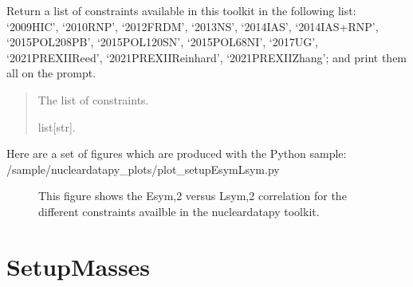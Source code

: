 \documentclass[letterpaper,10pt,english]{sphinxmanual}
\begin{document}

\begin{fulllineitems}
\label{\detokenize{source/api/setup_EsymLsym:nucleardatapy.setup_EsymLsym.constraints_EsymLsym}}
\pysigstartsignatures
{}
\pysigstopsignatures
\sphinxAtStartPar
Return a list of constraints available in this toolkit in the     following list: ‘2009\sphinxhyphen{}HIC’, ‘2010\sphinxhyphen{}RNP’, ‘2012\sphinxhyphen{}FRDM’, ‘2013\sphinxhyphen{}NS’,     ‘2014\sphinxhyphen{}IAS’, ‘2014\sphinxhyphen{}IAS+RNP’, ‘2015\sphinxhyphen{}POL\sphinxhyphen{}208PB’, ‘2015\sphinxhyphen{}POL\sphinxhyphen{}120SN’,     ‘2015\sphinxhyphen{}POL\sphinxhyphen{}68NI’, ‘2017\sphinxhyphen{}UG’, ‘2021\sphinxhyphen{}PREXII\sphinxhyphen{}Reed’,     ‘2021\sphinxhyphen{}PREXII\sphinxhyphen{}Reinhard’, ‘2021\sphinxhyphen{}PREXII\sphinxhyphen{}Zhang’; and     print them all on the prompt.
\begin{quote}\begin{description}
\sphinxAtStartPar
The list of constraints.

\sphinxAtStartPar
list{[}str{]}.

\end{description}\end{quote}

\end{fulllineitems}


\sphinxAtStartPar
Here are a set of figures which are produced with the Python sample: /sample/nucleardatapy\_plots/plot\_setupEsymLsym.py

\begin{figure}[htbp]
\centering
\capstart

\noindent{}
\caption{This figure shows the Esym,2 versus Lsym,2 correlation for the different constraints availble in the nucleardatapy toolkit.}\label{\detokenize{source/api/setup_EsymLsym:id1}}\end{figure}

\sphinxstepscope


\section{SetupMasses}
\label{\detokenize{source/api/setup_masses:setupmasses}}\label{\detokenize{source/api/setup_masses::doc}}\label{\detokenize{source/api/setup_masses:module-nucleardatapy.setup_masses}}
\end{document}
